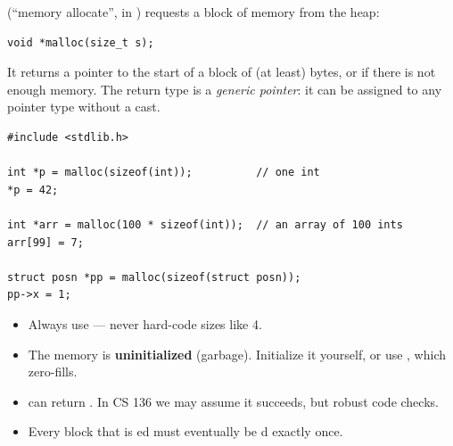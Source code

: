  (``memory allocate'', in ) requests a block of memory from the
heap:
\begin{lstlisting}[style=c]
void *malloc(size_t s);
\end{lstlisting}
It returns a pointer to the start of a block of (at least)  bytes, or  if
there is not enough memory. The return type  is a \emph{generic pointer}: it can be
assigned to any pointer type without a cast.

\begin{lstlisting}[style=c]
#include <stdlib.h>

int *p = malloc(sizeof(int));          // one int
*p = 42;

int *arr = malloc(100 * sizeof(int));  // an array of 100 ints
arr[99] = 7;

struct posn *pp = malloc(sizeof(struct posn));
pp->x = 1;
\end{lstlisting}

\begin{important}
\begin{itemize}
  \item Always use  --- never hard-code sizes like 4.
  \item The memory is \textbf{uninitialized} (garbage). Initialize it yourself, or use
    , which zero-fills.
  \item {} can return . In CS 136 we may assume it succeeds, but robust code
    checks.
  \item Every block that is ed must eventually be d exactly once.
\end{itemize}
\end{important}

\begin{center}
\end{center}

\section{}


